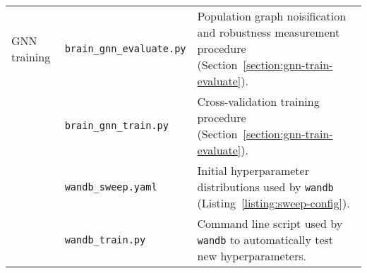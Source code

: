\begin{center}
\begin{longtable}[]{p{}p{}p{}}
    GNN training
            & \texttt{brain\_gnn\_evaluate.py} & Population graph noisification and robustness measurement procedure (Section~\ref{section:gnn-train-evaluate}). \\
            & \texttt{brain\_gnn\_train.py} & Cross-validation training procedure (Section~\ref{section:gnn-train-evaluate}). \\
            & \texttt{wandb\_sweep.yaml} & Initial hyperparameter distributions used by \texttt{wandb} (Listing~\ref{listing:sweep-config}). \\
            & \texttt{wandb\_train.py} & Command line script used by \texttt{wandb} to automatically test new hyperparameters. \\
\end{longtable}
\end{center}
